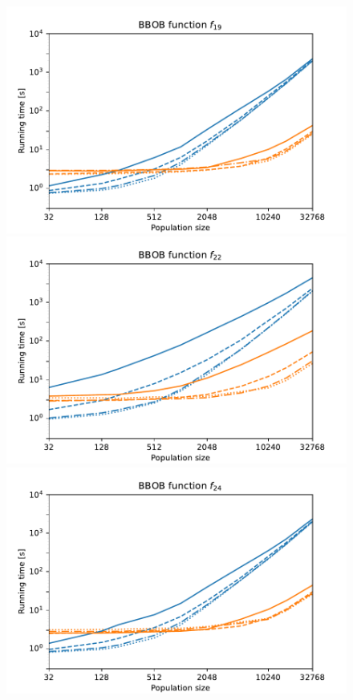 \begin{figure}[ht!]
\begin{minipage}[t]{0.32\textwidth}
    \end{minipage}

    \centering
    \begin{minipage}[t]{0.32\textwidth}
        \centering
        \includegraphics[width=\textwidth]{img/runs/time_pso2011_fn19_alldim.pdf}
    \end{minipage}
    \hfill
    \begin{minipage}[t]{0.32\textwidth}
        \centering
        \includegraphics[width=\textwidth]{img/runs/time_pso2011_fn22_alldim.pdf}
    \end{minipage}
    \hfill
    \begin{minipage}[t]{0.32\textwidth}
        \centering
        \includegraphics[width=\textwidth]{img/runs/time_pso2011_fn24_alldim.pdf}

\end{minipage}
\end{figure}
